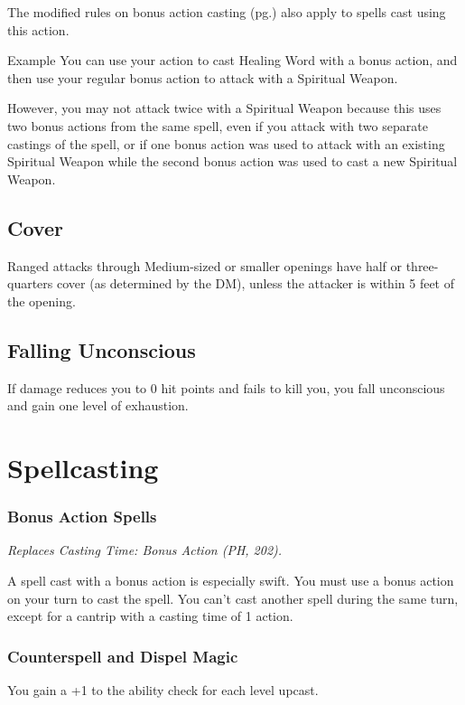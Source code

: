 \documentclass[letterpaper,twocolumn,openany,nodeprecatedcode]{dndbook}
\begin{document}
The modified rules on bonus action casting (pg.\pageref{bonusActionSpells}) also apply to spells cast using this action.

\begin{DndComment}{Example}
You can use your action to cast Healing Word with a bonus action, and then use your regular bonus action to attack with a Spiritual Weapon. 

However, you may not attack twice with a Spiritual Weapon because this uses two bonus actions from the same spell, even if you attack with two separate castings of the spell, or if one bonus action was used to attack with an existing Spiritual Weapon while the second bonus action was used to cast a new Spiritual Weapon.
\end{DndComment}

\subsection{Cover}
Ranged attacks through Medium-sized or smaller openings have half or three-quarters cover (as determined by the DM), unless the attacker is within 5 feet of the opening.

\subsection{Falling Unconscious}
If damage reduces you to 0 hit points and fails to kill you, you fall unconscious and gain one level of exhaustion.







\section{Spellcasting}

\subsubsection{Bonus Action Spells}
\label{bonusActionSpells}
\textit{Replaces Casting Time: Bonus Action (PH, 202).}

A spell cast with a bonus action is especially swift. You must use a bonus action on your turn to cast the spell. You can't cast another spell during the same turn, except for a cantrip with a casting time of 1 action.

\subsubsection{Counterspell and Dispel Magic}
You gain a +1 to the ability check for each level upcast.
\end{document}
